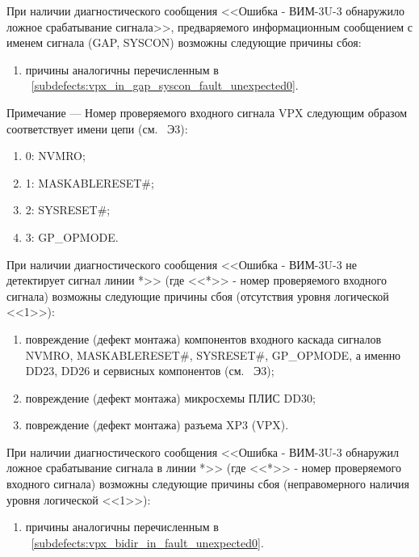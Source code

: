 \begin{sloppypar}
    \subpoint При наличии диагностического сообщения <<Ошибка - ВИМ-3U-3 обнаружило ложное срабатывание сигнала>>,
	      предваряемого информационным сообщением с именем сигнала (GAP, SYSCON) возможны следующие причины сбоя:
      \begin{enumerate}
	\item причины аналогичны перечисленным в ~\ref{subdefects:vpx_in_gap_syscon_fault_unexpected0}.
      \end{enumerate}  
      
  \end{sloppypar}  
  \begin{sloppypar}
    
    \begin{footnotesize}    
      Примечание --- Номер проверяемого входного сигнала VPX следующим образом соответствует имени цепи (см. \DocProductSignature~Э3):
      \begin{enumerate}
	\item 0: NVMRO;
	\item 1: MASKABLERESET\#;
	\item 2: SYSRESET\#;
	\item 3: GP\_OPMODE.
      \end{enumerate}      
    \end{footnotesize}
    
    \subpoint При наличии диагностического сообщения <<Ошибка - ВИМ-3U-3 не детектирует сигнал линии *>>
	      (где <<*>> - номер проверяемого входного сигнала) возможны следующие причины сбоя (отсутствия уровня логической <<1>>):
    \label{subdefects:vpx_bidir_in_fault_unexpected0}
      \begin{enumerate}
	\item повреждение (дефект монтажа) компонентов входного каскада сигналов NVMRO, MASKABLERESET\#, SYSRESET\#, GP\_OPMODE,
	      а именно DD23, DD26 и сервисных компонентов (см. \DocProductSignature~Э3);
	\item повреждение (дефект монтажа) микросхемы ПЛИС DD30;
	\item повреждение (дефект монтажа) разъема XP3 (VPX).
      \end{enumerate}
      
    \subpoint При наличии диагностического сообщения <<Ошибка - ВИМ-3U-3 обнаружил ложное срабатывание сигнала в линии *>>
	      (где <<*>> - номер проверяемого входного сигнала) возможны следующие причины сбоя (неправомерного наличия уровня логической <<1>>):
      \begin{enumerate}
	\item причины аналогичны перечисленным в ~\ref{subdefects:vpx_bidir_in_fault_unexpected0}.
      \end{enumerate}
    
  \end{sloppypar}
       
